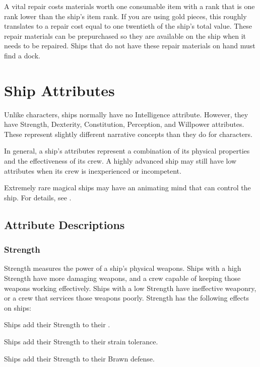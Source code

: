     A vital repair costs materials worth one consumable item with a rank that is one rank lower than the ship's item rank.
    If you are using gold pieces, this roughly translates to a repair cost equal to one twentieth of the ship's total value.
    These repair materials can be prepurchased so they are available on the ship when it needs to be repaired.
    Ships that do not have these repair materials on hand must find a dock.

\section{Ship Attributes}\label{Ship Attributes}
  Unlike characters, ships normally have no Intelligence attribute.
  However, they have Strength, Dexterity, Constitution, Perception, and Willpower attributes.
  These represent slightly different narrative concepts than they do for characters.

  In general, a ship's attributes represent a combination of its physical properties and the effectiveness of its crew.
  A highly advanced ship may still have low attributes when its crew is inexperienced or incompetent.

  Extremely rare magical ships may have an animating mind that can control the ship.
  For details, see .

  \subsection{Attribute Descriptions}

    \subsubsection{Strength}
      Strength measures the power of a ship's physical weapons.
      Ships with a high Strength have more damaging weapons, and a crew capable of keeping those weapons working effectively.
      Ships with a low Strength have ineffective weaponry, or a crew that services those weapons poorly.
      Strength has the following effects on ships:
      \begin{raggeditemize}
        \item Ships add their Strength to their .
        \item Ships add their Strength to their strain tolerance.
        \item Ships add their Strength to their Brawn defense.
      \end{raggeditemize}

